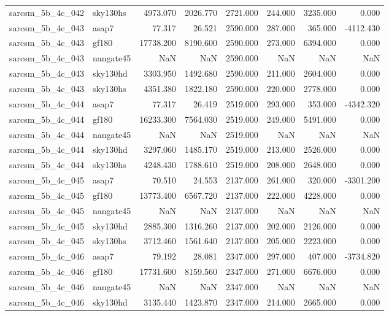 \begin{tabular}{llrrrrrr}
sarcsm\_5b\_4c\_042 & sky130hs & 4973.070 & 2026.770 & 2721.000 & 244.000 & 3235.000 & 0.000 \\
sarcsm\_5b\_4c\_043 & asap7 & 77.317 & 26.521 & 2590.000 & 287.000 & 365.000 & -4112.430 \\
sarcsm\_5b\_4c\_043 & gf180 & 17738.200 & 8190.600 & 2590.000 & 273.000 & 6394.000 & 0.000 \\
sarcsm\_5b\_4c\_043 & nangate45 & NaN & NaN & 2590.000 & NaN & NaN & NaN \\
sarcsm\_5b\_4c\_043 & sky130hd & 3303.950 & 1492.680 & 2590.000 & 211.000 & 2604.000 & 0.000 \\
sarcsm\_5b\_4c\_043 & sky130hs & 4351.380 & 1822.180 & 2590.000 & 220.000 & 2778.000 & 0.000 \\
sarcsm\_5b\_4c\_044 & asap7 & 77.317 & 26.419 & 2519.000 & 293.000 & 353.000 & -4342.320 \\
sarcsm\_5b\_4c\_044 & gf180 & 16233.300 & 7564.030 & 2519.000 & 249.000 & 5491.000 & 0.000 \\
sarcsm\_5b\_4c\_044 & nangate45 & NaN & NaN & 2519.000 & NaN & NaN & NaN \\
sarcsm\_5b\_4c\_044 & sky130hd & 3297.060 & 1485.170 & 2519.000 & 213.000 & 2526.000 & 0.000 \\
sarcsm\_5b\_4c\_044 & sky130hs & 4248.430 & 1788.610 & 2519.000 & 208.000 & 2648.000 & 0.000 \\
sarcsm\_5b\_4c\_045 & asap7 & 70.510 & 24.553 & 2137.000 & 261.000 & 320.000 & -3301.200 \\
sarcsm\_5b\_4c\_045 & gf180 & 13773.400 & 6567.720 & 2137.000 & 222.000 & 4228.000 & 0.000 \\
sarcsm\_5b\_4c\_045 & nangate45 & NaN & NaN & 2137.000 & NaN & NaN & NaN \\
sarcsm\_5b\_4c\_045 & sky130hd & 2885.300 & 1316.260 & 2137.000 & 202.000 & 2126.000 & 0.000 \\
sarcsm\_5b\_4c\_045 & sky130hs & 3712.460 & 1561.640 & 2137.000 & 205.000 & 2223.000 & 0.000 \\
sarcsm\_5b\_4c\_046 & asap7 & 79.192 & 28.081 & 2347.000 & 297.000 & 407.000 & -3734.820 \\
sarcsm\_5b\_4c\_046 & gf180 & 17731.600 & 8159.560 & 2347.000 & 271.000 & 6676.000 & 0.000 \\
sarcsm\_5b\_4c\_046 & nangate45 & NaN & NaN & 2347.000 & NaN & NaN & NaN \\
sarcsm\_5b\_4c\_046 & sky130hd & 3135.440 & 1423.870 & 2347.000 & 214.000 & 2665.000 & 0.000 \\

\end{tabular}
